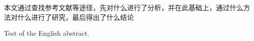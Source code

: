 \begin{cabstract}



本文通过查找参考文献等途径，先对什么进行了分析，并在此基础上，通过什么方法对什么进行了研究，最后得出了什么结论



\end{cabstract}




\begin{eabstract}
	Test of the English abstract.
\end{eabstract}

